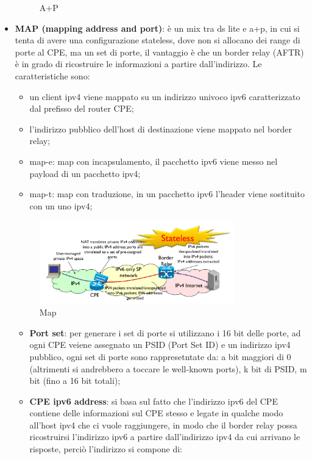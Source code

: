 \documentclass[12pt]{article}
\begin{document}
\begin{itemize}
\begin{figure}[H]
            \caption{A+P}
            \label{fig:a+p}
        \end{figure}
\item \textbf{MAP (mapping address and port)}: \`e un mix tra ds lite e a+p, in cui si tenta di avere una configurazione stateless, dove non si allocano dei range di porte al CPE, ma un set di porte, il vantaggio \`e che un border relay (AFTR) \`e in grado di ricostruire le informazioni a partire dall'indirizzo. Le caratteristiche sono:
    \begin{itemize}
        \item un client ipv4 viene mappato su un indirizzo univoco ipv6 caratterizzato dal prefisso del router CPE;
        \item l'indirizzo pubblico dell'host di destinazione viene mappato nel border relay;
        \item map-e: map con incapsulamento, il pacchetto ipv6 viene messo nel payload di un pacchetto ipv4;
        \item map-t: map con traduzione, in un pacchetto ipv6 l'header viene sostituito con un uno ipv4;
    \end{itemize}
    \begin{figure}[H]
        \centering
        \includegraphics[width=0.8\textwidth]{map.png}
        \caption{Map}
        \label{fig:map}
    \end{figure}
    \begin{itemize}
        \item \textbf{Port set}: per generare i set di porte si utilizzano i 16 bit delle porte, ad ogni CPE veiene assegnato un PSID (Port Set ID) e un indirizzo ipv4 pubblico, ogni set di porte sono rappresetntate da: a bit maggiori di 0 (altrimenti si andrebbero a toccare le well-known ports), k bit di PSID, m bit (fino a 16 bit totali);
        \item \textbf{CPE ipv6 address}: si basa sul fatto che l'indirizzo ipv6 del CPE contiene delle informazioni sul CPE stesso e legate in qualche modo all'host ipv4 che ci vuole raggiungere, in modo che il border relay possa ricostruirsi l'indirizzo ipv6 a partire dall'indirizzo ipv4 da cui arrivano le risposte, perci\`o l'indirizzo si compone di:

\end{itemize}
\end{itemize}
\end{document}
